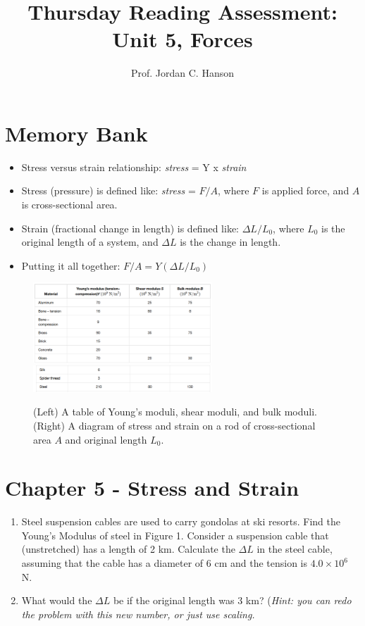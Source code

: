 \documentclass{article}
\begin{document}
\title{Thursday Reading Assessment: Unit 5, Forces}
\author{Prof. Jordan C. Hanson}

\maketitle

\section{Memory Bank}

\begin{itemize}
\item Stress versus strain relationship: \textit{stress} = Y x \textit{strain}
\item Stress (pressure) is defined like: \textit{stress} = $F/A$, where $F$ is applied force, and $A$ is cross-sectional area.
\item Strain (fractional change in length) is defined like: $\Delta L / L_{0}$, where $L_0$ is the original length of a system, and $\Delta L$ is the change in length.
\item Putting it all together: $F/A = Y (\Delta L/L_{0})$
\end{itemize}
\begin{figure}[ht]
\centering
\includegraphics[width=0.6\textwidth]{figures/modulus.png} \\
\includegraphics[width=0.6\textwidth]{figures/moduli2.png}
\caption{\label{fig:strain} (Left) A table of Young's moduli, shear moduli, and bulk moduli. (Right) A diagram of stress and strain on a rod of cross-sectional area $A$ and original length $L_0$.}
\end{figure}
\section{Chapter 5 - Stress and Strain}
\begin{enumerate}
\item Steel suspension cables are used to carry gondolas at ski resorts.  Find the Young's Modulus of steel in Figure 1.  Consider a suspension cable that (unstretched) has a length of 2 km. Calculate the $\Delta L$ in the steel cable, assuming that the cable has a diameter of 6 cm and the tension is $4.0 \times 10^6$ N. \\ \vspace{2cm}
\item What would the $\Delta L$ be if the original length was 3 km? (\textit{Hint: you can redo the problem with this new number, or just use scaling.}
\end{enumerate}
\end{document}
